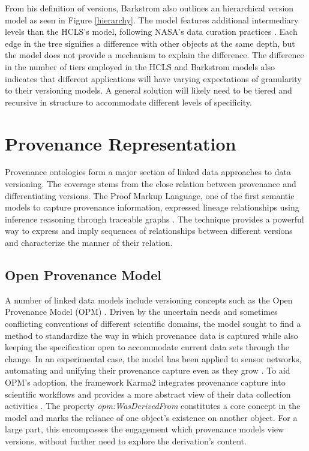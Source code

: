 From his definition of versions, Barkstrom also outlines an hierarchical version model as seen in Figure \ref{hierarchy}.
The model features additional intermediary levels than the HCLS's model, following NASA's data curation practices \cite{barkstrom2014earth}.
Each edge in the tree signifies a difference with other objects at the same depth, but the model does not provide a mechanism to explain the difference.
The difference in the number of tiers employed in the HCLS and Barkstrom models also indicates that different applications will have varying expectations of granularity to their versioning models.
A general solution will likely need to be tiered and recursive in structure to accommodate different levels of specificity.

\section{Provenance Representation}

Provenance ontologies form a major section of linked data approaches to data versioning.
The coverage stems from the close relation between provenance and differentiating versions.
The Proof Markup Language, one of the first semantic models to capture provenance information, expressed lineage relationships using inference reasoning through traceable graphs \cite{daSilva2006381}.
The technique provides a powerful way to express and imply sequences of relationships between different versions and characterize the manner of their relation.

\subsection{Open Provenance Model}

A number of linked data models include versioning concepts such as the Open Provenance Model (OPM) \cite{moreau2008open}.
Driven by the uncertain needs and sometimes conflicting conventions of different scientific domains, the model sought to find a method to standardize the way in which provenance data is captured while also keeping the specification open to accommodate current data sets through the change.
In an experimental case, the model has been applied to sensor networks, automating and unifying their provenance capture even as they grow \cite{5478496}.
To aid OPM's adoption, the framework Karma2 integrates provenance capture into scientific workflows and provides a more abstract view of their data collection activities \cite{simmhan2010karma2}.
The property \textit{opm:WasDerivedFrom} constitutes a core concept in the model and marks the reliance of one object's existence on another object.
For a large part, this encompasses the engagement which provenance models view versions, without further need to explore the derivation's content.

